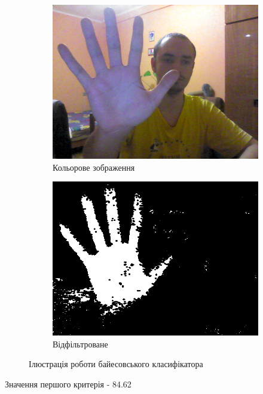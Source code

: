 \begin{figure}[H]
	\centering
	\begin{subfigure}[b]{0.45\textwidth}
		\includegraphics[width=\textwidth]{practise/img/b_color1}
		\caption{Кольорове зображення}
	\end{subfigure}
	\hfill
	\begin{subfigure}[b]{0.45\textwidth}
		\includegraphics[width=\textwidth]{practise/img/b_mask1}
		\caption{Відфільтроване}
	\end{subfigure}
	\caption{Ілюстрація роботи байесовського класифікатора}
	\label{fig:bayesian1}
\end{figure}

Значення першого критерія - 84.62%

